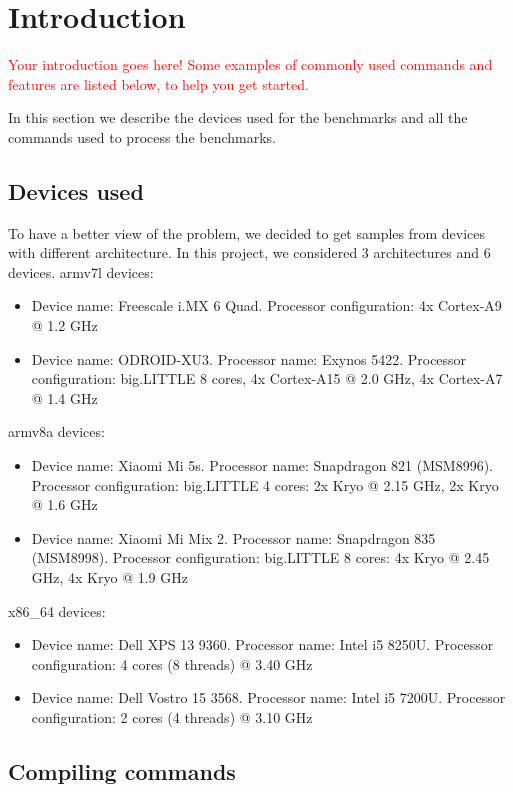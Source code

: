 \section{Introduction}

\textcolor{red}{Your introduction goes here! Some examples of commonly used commands and features are listed below, to help you get started.}

In this section we describe the devices used for the benchmarks and all the commands used to process the benchmarks.

\subsection{Devices used}

To have a better view of the problem, we decided to get samples from devices with different architecture.
In this project, we considered 3 architectures and 6 devices.\newline 
armv7l devices:
\begin{itemize}
	\item Device name: Freescale i.MX 6 Quad. Processor configuration: 4x Cortex-A9 @ 1.2 GHz
	\item Device name: ODROID-XU3. Processor name: Exynos 5422. Processor configuration: big.LITTLE 8 cores, 4x Cortex-A15 @ 2.0 GHz, 4x Cortex-A7 @ 1.4 GHz 
\end{itemize}
armv8a devices:
\begin{itemize}
	\item Device name: Xiaomi Mi 5s. Processor name: Snapdragon 821 (MSM8996). Processor configuration: big.LITTLE 4 cores: 2x Kryo @ 2.15 GHz, 2x Kryo @ 1.6 GHz
	\item Device name: Xiaomi Mi Mix 2. Processor name: Snapdragon 835 (MSM8998). Processor configuration: big.LITTLE 8 cores: 4x Kryo @ 2.45 GHz, 4x Kryo @ 1.9 GHz
\end{itemize}
x86\_64 devices:
\begin{itemize}
	\item Device name: Dell XPS 13 9360. Processor name: Intel i5 8250U. Processor configuration: 4 cores (8 threads) @ 3.40 GHz
	\item Device name: Dell Vostro 15 3568. Processor name: Intel i5 7200U.
	Processor configuration: 2 cores (4 threads) @ 3.10 GHz
\end{itemize}
\subsection{Compiling commands}


